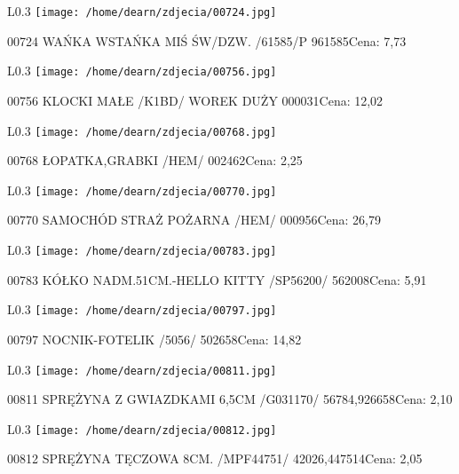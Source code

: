 \begin{wrapfigure}{L}{0.3\textwidth}
\texttt{[image: /home/dearn/zdjecia/00724.jpg]}
\end{wrapfigure}
00724 WAŃKA WSTAŃKA MIŚ ŚW/DZW. /61585/P              961585Cena: 7,73\newline
\begin{wrapfigure}{L}{0.3\textwidth}
\texttt{[image: /home/dearn/zdjecia/00756.jpg]}
\end{wrapfigure}
00756 KLOCKI MAŁE /K1BD/ WOREK DUŻY                   000031Cena: 12,02\newline
\begin{wrapfigure}{L}{0.3\textwidth}
\texttt{[image: /home/dearn/zdjecia/00768.jpg]}
\end{wrapfigure}
00768 ŁOPATKA,GRABKI /HEM/                            002462Cena: 2,25\newline
\begin{wrapfigure}{L}{0.3\textwidth}
\texttt{[image: /home/dearn/zdjecia/00770.jpg]}
\end{wrapfigure}
00770 SAMOCHÓD STRAŻ POŻARNA  /HEM/                   000956Cena: 26,79\newline
\begin{wrapfigure}{L}{0.3\textwidth}
\texttt{[image: /home/dearn/zdjecia/00783.jpg]}
\end{wrapfigure}
00783 KÓŁKO NADM.51CM.-HELLO KITTY /SP56200/          562008Cena: 5,91\newline
\begin{wrapfigure}{L}{0.3\textwidth}
\texttt{[image: /home/dearn/zdjecia/00797.jpg]}
\end{wrapfigure}
00797 NOCNIK-FOTELIK  /5056/                          502658Cena: 14,82\newline
\begin{wrapfigure}{L}{0.3\textwidth}
\texttt{[image: /home/dearn/zdjecia/00811.jpg]}
\end{wrapfigure}
00811 SPRĘŻYNA Z GWIAZDKAMI 6,5CM /G031170/     56784,926658Cena: 2,10\newline
\begin{wrapfigure}{L}{0.3\textwidth}
\texttt{[image: /home/dearn/zdjecia/00812.jpg]}
\end{wrapfigure}
00812 SPRĘŻYNA TĘCZOWA 8CM. /MPF44751/          42026,447514Cena: 2,05\newline
